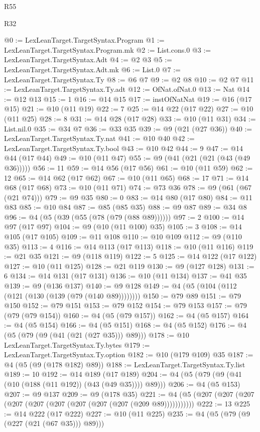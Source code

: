\begin{lexlean}{R55}
\begin{lexlean}{R32}
\begin{coremodule}
{{{{{{{{{{{{{{{{{{{{{{{{{{{{{{{{{{{{{{{{{{{{{{{{{{{@0 := LexLeanTarget.TargetSyntax.Program
@1 := LexLeanTarget.TargetSyntax.Program.mk
@2 := List.cons.{0}
@3 := LexLeanTarget.TargetSyntax.Adt
@4 := @2 @3
@5 := LexLeanTarget.TargetSyntax.Adt.mk
@6 := List.{0}
@7 := LexLeanTarget.TargetSyntax.Ty
@8 := @6 @7
@9 := @2 @8
@10 := @2 @7
@11 := LexLeanTarget.TargetSyntax.Ty.adt
@12 := OfNat.ofNat.{0}
@13 := Nat
@14 := @12 @13
@15 := 1
@16 := @14 @15
@17 := instOfNatNat
@19 := @16 (@17 @15)
@21 := @10 (@11 @19)
@22 := 7
@25 := @14 @22 (@17 @22)
@27 := @10 (@11 @25)
@28 := 8
@31 := @14 @28 (@17 @28)
@33 := @10 (@11 @31)
@34 := List.nil.{0}
@35 := @34 @7
@36 := @33 @35
@39 := @9 (@21 (@27 @36))
@40 := LexLeanTarget.TargetSyntax.Ty.nat
@41 := @10 @40
@42 := LexLeanTarget.TargetSyntax.Ty.bool
@43 := @10 @42
@44 := 9
@47 := @14 @44 (@17 @44)
@49 := @10 (@11 @47)
@55 := @9 (@41 (@21 (@21 (@43 (@49 @36)))))
@56 := 11
@59 := @14 @56 (@17 @56)
@61 := @10 (@11 @59)
@62 := 12
@65 := @14 @62 (@17 @62)
@67 := @10 (@11 @65)
@68 := 17
@71 := @14 @68 (@17 @68)
@73 := @10 (@11 @71)
@74 := @73 @36
@78 := @9 (@61 (@67 (@21 @74)))
@79 := @9 @35
@80 := 0
@83 := @14 @80 (@17 @80)
@84 := @11 @83
@85 := @10 @84
@87 := @85 (@85 @35)
@88 := @9 @87
@89 := @34 @8
@96 := @4 (@5 (@39 (@55 (@78 (@79 (@88 @89))))))
@97 := 2
@100 := @14 @97 (@17 @97)
@104 := @9 (@10 (@11 @100) @35)
@105 := 3
@108 := @14 @105 (@17 @105)
@109 := @11 @108
@110 := @10 @109
@112 := @9 (@110 @35)
@113 := 4
@116 := @14 @113 (@17 @113)
@118 := @10 (@11 @116)
@119 := @21 @35
@121 := @9 (@118 @119)
@122 := 5
@125 := @14 @122 (@17 @122)
@127 := @10 (@11 @125)
@128 := @21 @119
@130 := @9 (@127 @128)
@131 := 6
@134 := @14 @131 (@17 @131)
@136 := @10 (@11 @134)
@137 := @41 @35
@139 := @9 (@136 @137)
@140 := @9 @128
@149 := @4 (@5 (@104 (@112 (@121 (@130 (@139 (@79 (@140 @89))))))))
@150 := @79 @89
@151 := @79 @150
@152 := @79 @151
@153 := @79 @152
@154 := @79 @153
@157 := @79 (@79 (@79 @154))
@160 := @4 (@5 (@79 @157))
@162 := @4 (@5 @157)
@164 := @4 (@5 @154)
@166 := @4 (@5 @151)
@168 := @4 (@5 @152)
@176 := @4 (@5 (@79 (@9 (@41 (@21 (@27 @35))) @89)))
@178 := @10 LexLeanTarget.TargetSyntax.Ty.bytes
@179 := LexLeanTarget.TargetSyntax.Ty.option
@182 := @10 (@179 @109) @35
@187 := @4 (@5 (@9 (@178 @182) @89))
@188 := LexLeanTarget.TargetSyntax.Ty.list
@189 := 10
@192 := @14 @189 (@17 @189)
@204 := @4 (@5 (@79 (@9 (@41 (@10 (@188 (@11 @192)) (@43 (@49 @35)))) @89)))
@206 := @4 (@5 @153)
@207 := @9 @137
@209 := @9 (@178 @35)
@221 := @4 (@5 (@207 (@207 (@207 (@207 (@207 (@207 (@207 (@207 (@207 (@209 @89)))))))))))
@222 := 13
@225 := @14 @222 (@17 @222)
@227 := @10 (@11 @225)
@235 := @4 (@5 (@79 (@9 (@227 (@21 (@67 @35))) @89)))
}}}}}}}}}}}}}}}}}}}}}}}}}}}}}}}}}}}}}}}}}}}}}}}}}}}
\end{coremodule}
\end{lexlean}
\end{lexlean}
